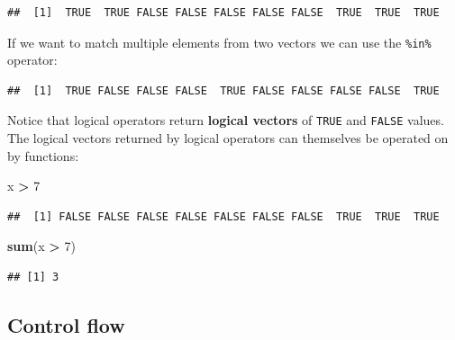 \documentclass[]{book}
\newenvironment{Shaded}{\begin{snugshade}}{\end{snugshade}}
\newcommand{\KeywordTok}[1]{\textcolor[rgb]{0.13,0.29,0.53}{\textbf{#1}}}
\newcommand{\DecValTok}[1]{\textcolor[rgb]{0.00,0.00,0.81}{#1}}
\newcommand{\StringTok}[1]{\textcolor[rgb]{0.31,0.60,0.02}{#1}}
\newcommand{\CommentTok}[1]{\textcolor[rgb]{0.56,0.35,0.01}{\textit{#1}}}
\newcommand{\OperatorTok}[1]{\textcolor[rgb]{0.81,0.36,0.00}{\textbf{#1}}}
\newcommand{\NormalTok}[1]{#1}
\begin{document}
\begin{verbatim}
##  [1]  TRUE  TRUE FALSE FALSE FALSE FALSE FALSE  TRUE  TRUE  TRUE
\end{verbatim}

If we want to match multiple elements from two vectors we can use the
\texttt{\%in\%} operator:

\begin{Shaded}
\end{Shaded}

\begin{verbatim}
##  [1]  TRUE FALSE FALSE FALSE  TRUE FALSE FALSE FALSE FALSE  TRUE
\end{verbatim}

Notice that logical operators return \textbf{logical vectors} of
\texttt{TRUE} and \texttt{FALSE} values. The logical vectors returned by
logical operators can themselves be operated on by functions:

\begin{Shaded}
\begin{Highlighting}[]
\NormalTok{x }\OperatorTok{>}\StringTok{ }\DecValTok{7}
\end{Highlighting}
\end{Shaded}

\begin{verbatim}
##  [1] FALSE FALSE FALSE FALSE FALSE FALSE FALSE  TRUE  TRUE  TRUE
\end{verbatim}

\begin{Shaded}
\begin{Highlighting}[]
\KeywordTok{sum}\NormalTok{(x }\OperatorTok{>}\StringTok{ }\DecValTok{7}\NormalTok{)}
\end{Highlighting}
\end{Shaded}

\begin{verbatim}
## [1] 3
\end{verbatim}

\subsection{Control flow}\label{control-flow}
\end{document}
